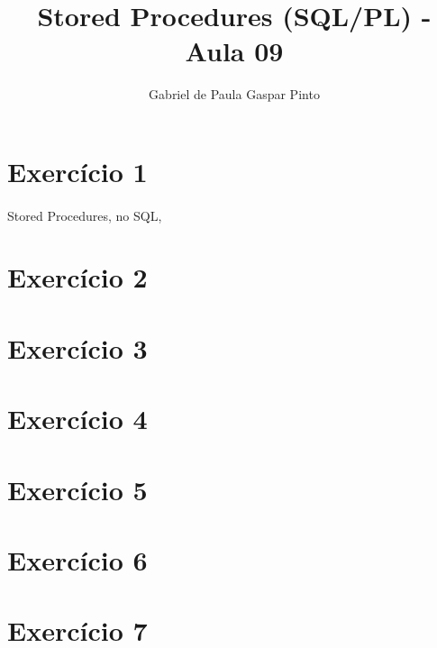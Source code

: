 \documentclass{article}
\title{Stored Procedures (SQL/PL) - Aula 09}
\author{Gabriel de Paula Gaspar Pinto}
\date{}
\begin{document}
\maketitle

\section*{Exercício 1}
    \paragraph{} Stored Procedures, no SQL, 

\section*{Exercício 2}

\section*{Exercício 3}

\section*{Exercício 4}

\section*{Exercício 5}

\section*{Exercício 6}

\section*{Exercício 7}
\end{document}
